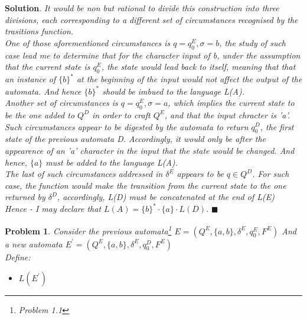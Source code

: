 \documentclass[12pt]{article}
\renewcommand{\=}[1]{\stackrel{#1}{=}} %
\newtheorem{p}{Problem}[section]
\theoremstyle{definition}
\newenvironment{s}{%
        \begin{trivlist} \item \textbf{Solution}. }{%
            \hspace*{\fill} $\blacksquare$\end{trivlist}}%
\begin{document}
\begin{s} \newline
\emph{It would be non but rational to divide this construction into three divisions, each corresponding to a different set of circumstances recognised by the trasitions function.} \newline
\\
\emph{One of those aforementioned circumstances is $q = q_0^{E}, \sigma = b$, the study of such case lead me to determine that for the character input of b, under the assumption that the current state is $q_0^{E}$, the state would lead back to itself, meaning that that an instance of $\{b\}^{*}$ at the beginning of the input would not affect the output of the automata. And hence $\{b\}^{*}$ should be imbued to the language L(A).} \newline
\\
\emph{Another set of circumstances is $q = q_0^{E}, \sigma = a$, which implies the current state to be the one added to $Q^{D}$ in order to craft $Q^{E}$, and that the input chracter is 'a'. Such circumstances appear to be digested by the automata to return $q_0^{D}$, the first state of the previous automata D. Accordingly, it would only be after the appearence of an 'a' character in the input that the state would be changed. And hence, $\{a\}$ must be added to the language L(A).} \newline
\\
\emph{The last of such circumstances addressed in $\delta^{E}$ appears to be $q \in Q^{D}$. For such case, the function would make the transition from the current state to the one returned by $\delta^{D}$, accordingly, L(D) must be concatenated at the end of L(E)} \newline 
\\
\emph{Hence - I may declare that $L(A) = \{b\}^{*} \cdot \{a\} \cdot L(D)$.}
\end{s}
\begin{p}
  \emph{\newline Consider the previous automata\footnote{Problem 1.1} $E = (Q^{E}, \{a,b\}, \delta^{E}, q_0^{E}, F^{E})$} \newline
  \emph{And a new automata $E^{\prime} = (Q^{E}, \{a,b\}, \delta^{E}, q_0^{D}, F^{E})$} \newline
  \\
  Define: 
  \begin{itemize}
    \item $L(E^{\prime})$
  \end{itemize}
\end{p}
\end{document}
